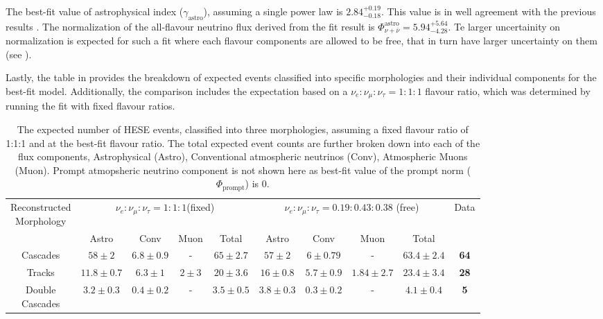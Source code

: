 The best-fit value of astrophysical index ($\gamma_{\mathrm{astro}}$), assuming a single power law is $2.84_{-0.18}^{+0.19}$. This value is in well agreement with the previous results . The  normalization of the all-flavour neutrino flux derived from the fit result is $\Phi_{\nu+\bar\nu}^{\mathrm{astro}} = 5.94_{-4.28}^{+5.64}$. Te larger uncertainity on normalization is expected for such a fit where each flavour components are allowed to be free, that in turn have larger uncertainty on them (see ). 

Lastly, the table in  provides the breakdown of expected events classified into specific morphologies and their individual components for the best-fit model. Additionally, the comparison includes the expectation based on a $\nu_e:\nu_{\mu}:\nu_{\tau} = 1:1:1$ flavour ratio, which was determined by running the fit with fixed flavour ratios.

\begin{table}[h]
    \caption{The expected number of HESE events, classified into three morphologies, assuming a fixed flavour ratio of 1:1:1 and at the best-fit flavour ratio. The total expected event counts are further broken down into each of the flux components, Astrophysical (Astro), Conventional atmospheric neutrinos (Conv), Atmospheric Muons (Muon). Prompt atmopsheric neutrino component is not shown here as best-fit value of the prompt norm ($\Phi_{\mathrm{prompt}}$) is 0.}
    
    \begin{tabular}{ c| c c c c |c c c c|c}
        
        \hline
        \makecell{Reconstructed \\ Morphology} & \multicolumn{4}{c|}{$\nu_e:\nu_{\mu}:\nu_{\tau} = 1:1:1$(fixed)}  & \multicolumn{4}{c|}{$\nu_e:\nu_{\mu}:\nu_{\tau} = 0.19:0.43:0.38$ (free)} & Data\\
         &Astro&Conv&Muon&Total&Astro&Conv&Muon&Total& \\
        \hline
        \hline
        Cascades&$58\pm2$&$6.8\pm0.9$&-&\textbf{$65\pm2.7$}&$57\pm2$&$6\pm0.79$&-&\textbf{$63.4\pm2.4$}&\textbf{64}\\
        Tracks&$11.8\pm0.7$&$6.3\pm1$&$2\pm3$&\textbf{$20\pm3.6$}&$16\pm0.8$&$5.7\pm0.9$&$1.84\pm2.7$&\textbf{$23.4\pm3.4$}&\textbf{28}\\
        \makecell{Double \\ Cascades}&$3.2\pm0.3$&$0.4\pm0.2$&-&\textbf{$3.5\pm0.5$}&$3.8\pm0.3$&$0.3\pm0.2$&-&\textbf{$4.1\pm0.4$}&\textbf{5}\\
        \hline
        \hline
    \end{tabular}
    
\end{table}

